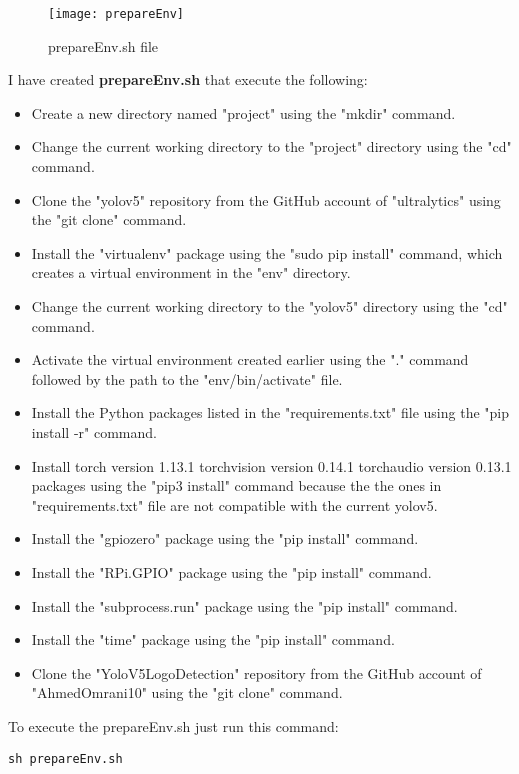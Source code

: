 \begin{itemize}
\begin{figure}[h]
       \centering

        \texttt{[image: prepareEnv]}
   
        \caption{prepareEnv.sh file}
        \label{fig:prepareEnv.sh file}

    \end{figure}
\FloatBarrier
I have created \textbf{prepareEnv.sh} that execute the following:
\begin{itemize}
    \item Create a new directory named "project" using the "mkdir" command.
    \item Change the current working directory to the "project" directory using the "cd" command.
    \item Clone the "yolov5" repository from the GitHub account of "ultralytics" using the "git clone" command.
    \item Install the "virtualenv" package using the "sudo pip install" command, which creates a virtual environment in the "env" directory.
    \item Change the current working directory to the "yolov5" directory using the "cd" command.
    \item Activate the virtual environment created earlier using the "." command followed by the path to the "env/bin/activate" file.
    \item Install the Python packages listed in the "requirements.txt" file using the "pip install -r" command.
    \item Install  torch version 1.13.1 torchvision version 0.14.1 torchaudio version 0.13.1 packages using the "pip3 install" command because the the ones in "requirements.txt" file are not compatible with the current yolov5.
    \item Install the "gpiozero" package using the "pip install" command.
    \item Install the "RPi.GPIO" package using the "pip install" command.
    \item Install the "subprocess.run" package using the "pip install" command.
    \item Install the "time" package using the "pip install" command.
    \item Clone the "YoloV5LogoDetection" repository from the GitHub account of "AhmedOmrani10" using the "git clone" command.
\end{itemize}
To execute the prepareEnv.sh just run this command:
\begin{lstlisting}
sh prepareEnv.sh
\end{lstlisting}

\end{itemize}
